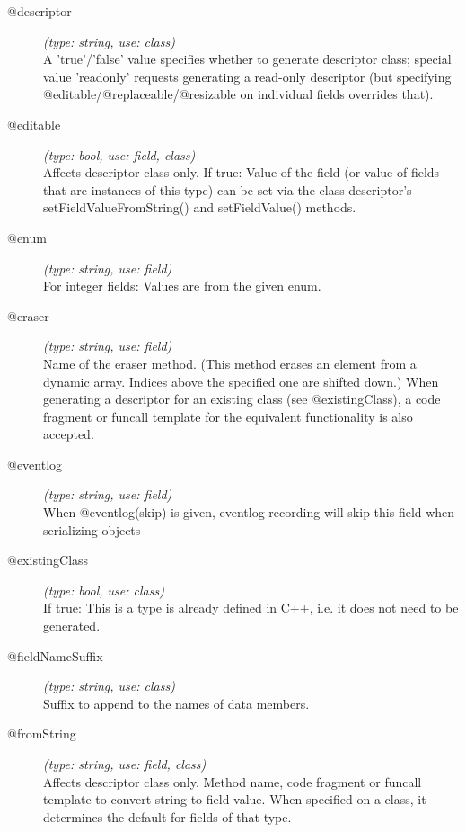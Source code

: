 \begin{description}
\item[@descriptor] \textit{(type: string, use: class)} \\
  A 'true'/'false' value specifies whether to generate descriptor class;
  special value 'readonly' requests generating a read-only descriptor (but
  specifying @editable/@replaceable/@resizable on individual fields overrides
  that).

\item[@editable] \textit{(type: bool, use: field, class)} \\
  Affects descriptor class only. If true: Value of the field (or value of
  fields that are instances of this type) can be set via the class
  descriptor's setFieldValueFromString() and setFieldValue() methods.

\item[@enum] \textit{(type: string, use: field)} \\
  For integer fields: Values are from the given enum.

\item[@eraser] \textit{(type: string, use: field)} \\
  Name of the eraser method. (This method erases an element from a dynamic
  array. Indices above the specified one are shifted down.) When generating a
  descriptor for an existing class (see @existingClass), a code fragment or
  funcall template for the equivalent functionality is also accepted.

\item[@eventlog] \textit{(type: string, use: field)} \\
  When @eventlog(skip) is given, eventlog recording will skip this field when
  serializing objects

\item[@existingClass] \textit{(type: bool, use: class)} \\
  If true: This is a type is already defined in C++, i.e. it does not need to
  be generated.

\item[@fieldNameSuffix] \textit{(type: string, use: class)} \\
  Suffix to append to the names of data members.

\item[@fromString] \textit{(type: string, use: field, class)} \\
  Affects descriptor class only. Method name, code fragment or funcall
  template to convert string to field value. When specified on a class, it
  determines the default for fields of that type.


\end{description}
